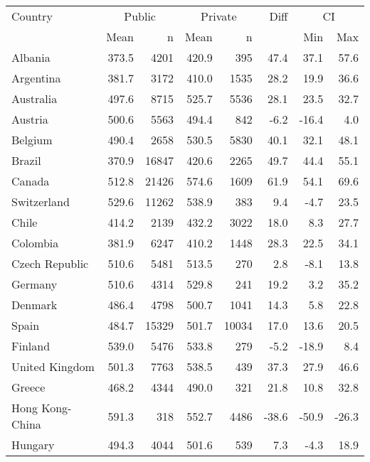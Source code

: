\begin{table}[ht]
\begin{center}
{\smaller
\begin{tabular}{lrr@{\extracolsep{10pt}}rr@{\extracolsep{10pt}}rrr}
  \hline
  Country & \multicolumn{2}{c}{Public} & \multicolumn{2}{c}{Private} & Diff & \multicolumn{2}{c}{CI} \\ \cline{2-3} \cline{4-5} \cline{7-8} & Mean & n & Mean & n & & Min & Max \\ \hline
Albania & 373.5 & 4201 & 420.9 & 395 & 47.4 & 37.1 & 57.6 \\ 
  Argentina & 381.7 & 3172 & 410.0 & 1535 & 28.2 & 19.9 & 36.6 \\ 
  Australia & 497.6 & 8715 & 525.7 & 5536 & 28.1 & 23.5 & 32.7 \\ 
  Austria & 500.6 & 5563 & 494.4 & 842 & -6.2 & -16.4 & 4.0 \\ 
  Belgium & 490.4 & 2658 & 530.5 & 5830 & 40.1 & 32.1 & 48.1 \\ 
  Brazil & 370.9 & 16847 & 420.6 & 2265 & 49.7 & 44.4 & 55.1 \\ 
  Canada & 512.8 & 21426 & 574.6 & 1609 & 61.9 & 54.1 & 69.6 \\ 
  Switzerland & 529.6 & 11262 & 538.9 & 383 & 9.4 & -4.7 & 23.5 \\ 
  Chile & 414.2 & 2139 & 432.2 & 3022 & 18.0 & 8.3 & 27.7 \\ 
  Colombia & 381.9 & 6247 & 410.2 & 1448 & 28.3 & 22.5 & 34.1 \\ 
  Czech Republic & 510.6 & 5481 & 513.5 & 270 & 2.8 & -8.1 & 13.8 \\ 
  Germany & 510.6 & 4314 & 529.8 & 241 & 19.2 & 3.2 & 35.2 \\ 
  Denmark & 486.4 & 4798 & 500.7 & 1041 & 14.3 & 5.8 & 22.8 \\ 
  Spain & 484.7 & 15329 & 501.7 & 10034 & 17.0 & 13.6 & 20.5 \\ 
  Finland & 539.0 & 5476 & 533.8 & 279 & -5.2 & -18.9 & 8.4 \\ 
  United Kingdom & 501.3 & 7763 & 538.5 & 439 & 37.3 & 27.9 & 46.6 \\ 
  Greece & 468.2 & 4344 & 490.0 & 321 & 21.8 & 10.8 & 32.8 \\ 
  Hong Kong-China & 591.3 & 318 & 552.7 & 4486 & -38.6 & -50.9 & -26.3 \\ 
  Hungary & 494.3 & 4044 & 501.6 & 539 & 7.3 & -4.3 & 18.9 \\ 

\end{tabular}}
\end{center}
\end{table}
